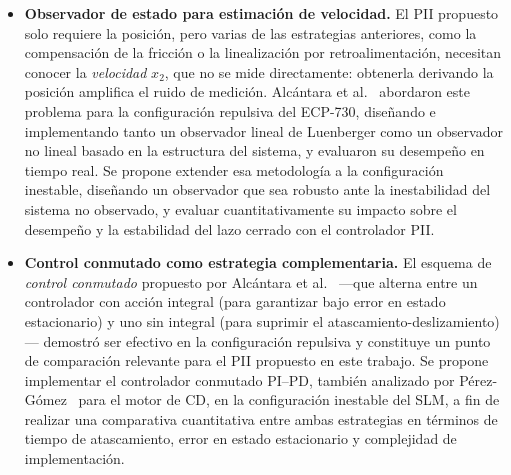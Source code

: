 \begin{itemize}
    \item \textbf{Observador de estado para estimación de velocidad.}
    El PII propuesto solo requiere la posición, pero varias de las estrategias anteriores, como la compensación de la fricción o la linealización por retroalimentación, necesitan conocer la \emph{velocidad} $x_2$, que no se mide directamente: obtenerla derivando la posición amplifica el ruido de medición. Alcántara et al.~\cite{alcantara}
    abordaron este problema para la configuración repulsiva del ECP-730, diseñando e
    implementando tanto un observador lineal de Luenberger como un observador no lineal
    basado en la estructura del sistema, y evaluaron su desempeño en tiempo real.
    Se propone extender esa metodología a la configuración inestable, diseñando un observador
    que sea robusto ante la inestabilidad del sistema no observado, y evaluar cuantitativamente
    su impacto sobre el desempeño y la estabilidad del lazo cerrado con el controlador PII.

    \item \textbf{Control conmutado como estrategia complementaria.}
    El esquema de \emph{control conmutado} propuesto por Alcántara et al.~\cite{alcantara}
    ---que alterna entre un controlador con acción integral (para garantizar bajo error en estado
    estacionario) y uno sin integral (para suprimir el atascamiento-deslizamiento)--- demostró
    ser efectivo en la configuración repulsiva y constituye un punto de comparación relevante
    para el PII propuesto en este trabajo. Se propone implementar el controlador conmutado
    PI--PD, también analizado por Pérez-Gómez~\cite{perez} para el motor de CD, en la
    configuración inestable del SLM, a fin de realizar una comparativa cuantitativa entre
    ambas estrategias en términos de tiempo de atascamiento, error en estado estacionario
    y complejidad de implementación.

\end{itemize}
